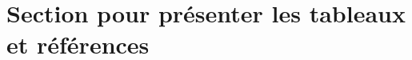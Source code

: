 \documentclass[../main/main.tex]{subfiles}
\begin{document}
\section{Section pour présenter les tableaux et références}%
\label{sec:section1-chap2}




\end{document}
